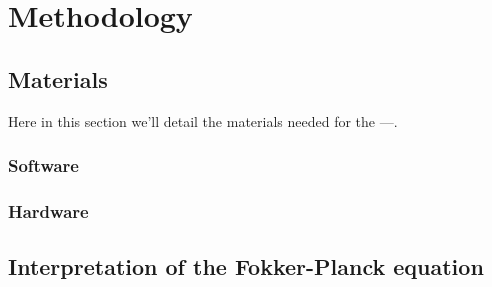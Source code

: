 
\chapter{Methodology}
\label{metodologia}
\section{Materials}
Here in this section we'll detail the materials needed for the ---.

\subsection{Software}
\subsection{Hardware}

\section{Interpretation of the Fokker-Planck equation}